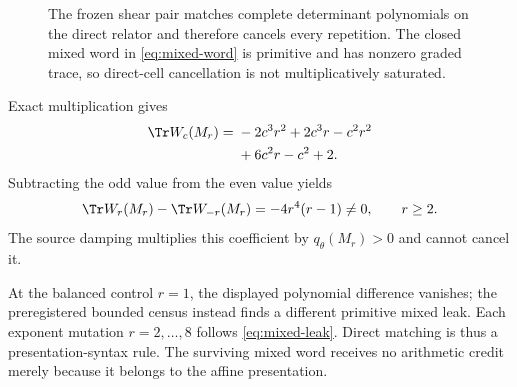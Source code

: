 \begin{figure}[H]
  \centering
  
  \caption{The frozen shear pair matches complete determinant polynomials on
  the direct relator and therefore cancels every repetition.  The closed
  mixed word in \cref{eq:mixed-word} is primitive and has nonzero graded
  trace, so direct-cell cancellation is not multiplicatively saturated.}
  \label{fig:shear-leakage}
\end{figure}

Exact multiplication gives
\begin{equation}
\begin{aligned}
  \Tr W_c(M_r)
  ={}&-2c^3r^2+2c^3r-c^2r^2\\
     &+6c^2r-c^2+2.
\end{aligned}
\label{eq:mixed-trace-polynomial}
\end{equation}
Subtracting the odd value from the even value yields
\begin{equation}
  \Tr W_r(M_r)-\Tr W_{-r}(M_r)
  =-4r^4(r-1)\ne0,
  \qquad r\ge2.
  \label{eq:mixed-leak}
\end{equation}
The source damping multiplies this coefficient by
$q_\theta(M_r)>0$ and cannot cancel it.

At the balanced control $r=1$, the displayed polynomial difference vanishes;
the preregistered bounded census instead finds a different primitive mixed
leak.  Each exponent mutation $r=2,\ldots,8$ follows
\cref{eq:mixed-leak}.  Direct matching is thus a presentation-syntax rule.
The surviving mixed word receives no arithmetic credit merely because it
belongs to the affine presentation.
